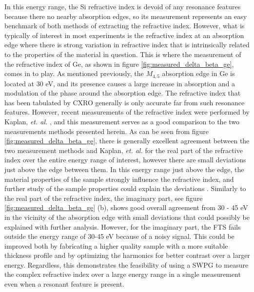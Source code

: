 In this energy range, the Si refractive index is devoid of any resonance features because there no nearby absorption edges, so its measurement represents an easy benchmark of both methods of extracting the refractive index. However, what is typically of interest in most experiments is the refractive index at an absorption edge where there is strong variation in refractive index that is intrinsically related to the properties of the material in question.  This is where the measurement of the refractive index of Ge, as shown in figure \ref{fig:measured_delta_beta_ge}, comes in to play.  As mentioned previously, the $M_{4,5}$ absorption edge in Ge is located at 30 eV, and its presence causes a large increase in absorption and a modulation of the phase around the absorption edge.  The refractive index that has been tabulated by CXRO generally is only accurate far from such resonance features. However, recent measurements of the refractive index were performed by Kaplan, \emph{et. al.} \cite{kaplanRetrievalComplexvaluedRefractive2019}, and this measurement serves as a good comparison to the two measurements methods presented herein.  As can be seen from figure \ref{fig:measured_delta_beta_ge}, there is generally excellent agreement between the two measurement methods and  Kaplan, \emph{et. al.} for the real part of the refractive index over the entire energy range of interest, however there are small deviations just above the edge between them. In this energy range just above the edge, the material properties of the sample strongly influence the refractive index, and further study of the sample properties could explain the deviations \cite{kaplanRetrievalComplexvaluedRefractive2019, stohrNEXAFSSpectroscopy1992, attwoodSoftXraysExtreme2000}.  Similarly to the real part of the refractive index, the imaginary part, see figure \ref{fig:measured_delta_beta_ge} (b), shows good overall agreement from 30 - 45 eV in the vicinity of the absorption edge with small deviations that could possibly be explained with further analysis.  However, for the imaginary part, the FTS fails outside the energy range of 30-45 eV because of a noisy signal.  This could be improved both by fabricating a higher quality sample with a more suitable thickness profile and by optimizing the harmonics for better contrast over a larger energy.  Regardless, this demonstrates the feasibility of using a SWPG to measure the complex refractive index over a large energy range in a single measurement even when a resonant feature is present.



